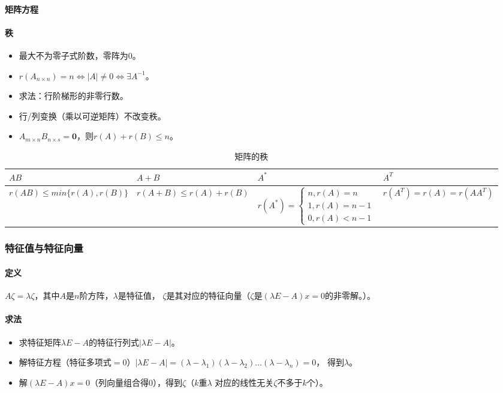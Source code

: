 \documentclass[
12pt, %
a4paper, 
oneside, %
headinclude,footinclude, %
]{scrartcl}
\begin{document}
\paragraph{矩阵方程}
\paragraph{秩}
\begin{itemize}
\item 最大不为零子式阶数，零阵为$ 0 $。
\item $ r(A_{n \times n}) = n \Leftrightarrow |A| \neq 0 \Leftrightarrow \exists A^{-1} $。
\item 求法：行阶梯形的非零行数。
\item 行/列变换（乘以可逆矩阵）不改变秩。
\item $ A_{m \times n}B_{n \times s} = \mathbf{0} $，则$ r(A) + r(B) \leq n $。
\end{itemize}

\begin{table}[hbt]
\caption{矩阵的秩}
\centering
\begin{tabular}{|p{3.8cm}|p{3.8cm}|p{3.8cm}|p{3.8cm}|}
\hline
$ AB $ & $ A + B $ & $ A^* $ & $ A^T $ \\
\hline
$ r(AB) \leq min\{r(A), r(B)\} $ & $ r(A + B) \leq r(A) + r(B) $ & $ r(A^*) = \begin{cases} n, r(A) = n \\ 1,  r(A) = n - 1 \\ 0, r(A) < n - 1 \end{cases} $ & $ r(A^T) = r(A) = r(AA^T) $ \\
\hline
\end{tabular}
\end{table}
\subsubsection{特征值与特征向量}
\paragraph{定义}
$ A\zeta = \lambda\zeta $，其中$ A $是$ n $阶方阵，$ \lambda $是特征值，
$ \zeta $是其对应的特征向量（$ \zeta $是$ (\lambda E - A)x = 0 $的非零解。）。
\paragraph{求法}
\begin{itemize}
\item 求特征矩阵$ \lambda E - A $的特征行列式$ |\lambda E - A| $。
\item 解特征方程（特征多项式$ = 0 $）$ |\lambda E - A| = (\lambda - \lambda_1)(\lambda - \lambda_2)\dots(\lambda - \lambda_n) = 0 $，
得到$ \lambda $。
\item 解$ (\lambda E - A)x = 0 $（列向量组合得$ 0 $），得到$ \zeta $（$ k $重$ \lambda $
对应的线性无关$ \zeta $不多于$ k $个）。
\end{itemize}
\end{document}
